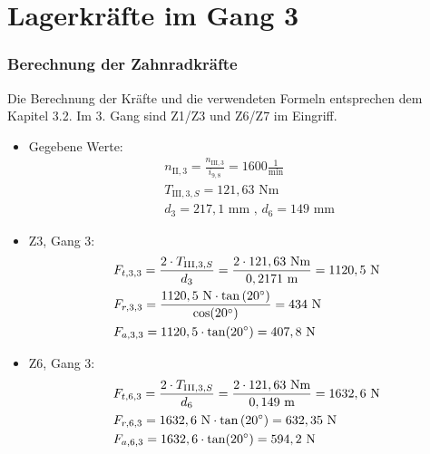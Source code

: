 \section{Lagerkräfte im Gang 3}
\subsubsection{Berechnung der Zahnradkräfte}
Die Berechnung der Kräfte und die verwendeten Formeln entsprechen dem Kapitel 3.2. Im 3. Gang sind Z1/Z3 und Z6/Z7 im Eingriff.
\begin{itemize}
	\item Gegebene Werte: 
	\begin{align*}
	&n_{\mathrm{II},3} = \frac{n_{\mathrm{III},3}}{i_{9,8}} = 1600\frac{1}{\text{min}} \\
	&T_{\mathrm{III},3,S} = 121,63\text{ Nm} \\	
	&d_3 = 217,1\text{ mm} \text{ , } d_6 = 149 \text{ mm } 
	\end{align*}
	\item Z3, Gang 3:
	\begin{align*} 
	&F_{t,3,3} = \frac{2\cdot T_{\mathrm{III},3,S}}{d_3} = \frac{2 \cdot 121,63 \text{ Nm}}{0,2171 \text{ m}} = 1120,5 \text{ N}\\ 
	&F_{r,3,3} = \frac{1120,5 \text{ N} \cdot \tan{(20^\circ)}}{\cos(20^\circ)} =434\text{ N}\\ 
	&F_{a,3,3} =1120,5 \cdot \tan(20^\circ) =407,8 \text{ N}
	\end{align*}
	\item Z6, Gang 3:
	\begin{align*}
	&F_{t,6,3} = \frac{2\cdot T_{\mathrm{III},3,S}}{d_6} = \frac{2 \cdot 121,63 \text{ Nm}}{0,149 \text{ m}} = 1632,6\text{ N}\\ 
	&F_{r,6,3} = 1632,6 \text{ N} \cdot \tan{(20^\circ)} = 632,35\text{ N}\\ 
	&F_{a,6,3} =1632,6\cdot \tan(20^\circ) =594,2 \text{ N}
	\end{align*}
\end{itemize}
\newpage

